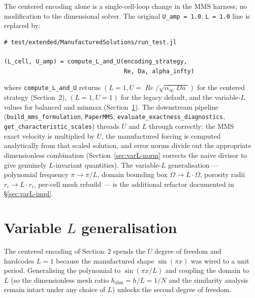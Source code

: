 \documentclass[11pt]{article}
\newcommand{\Reyn}{\operatorname{\mathit{Re}}}
\newcommand{\Damk}{\operatorname{\mathit{Da}}}
\newcommand{\code}[1]{\texttt{#1}}
\begin{document}
The centered encoding alone is a single-cell-loop change in the MMS
harness; no modification to the dimensional solver. The original
\code{U\_amp = 1.0}, \code{L = 1.0} line is replaced by:
\begin{center}
\begin{minipage}{0.9\linewidth}
\begin{lstlisting}[basicstyle=\ttfamily\small, frame=single]
# test/extended/ManufacturedSolutions/run_test.jl

(L_cell, U_amp) = compute_L_and_U(encoding_strategy,
                                  Re, Da, alpha_infty)
\end{lstlisting}
\end{minipage}
\end{center}
\noindent where \code{compute\_L\_and\_U} returns $(L=1, U=\Reyn/\sqrt{\alpha_\infty\Damk})$
for the centered strategy (Section~2), $(L=1, U=1)$ for the legacy
default, and the variable-$L$ values for balanced and minmax
(Section~\ref{sec:varL}). The downstream pipeline
(\code{build\_mms\_formulation}, \code{PaperMMS},
\code{evaluate\_exactness\_diagnostics}, \code{get\_characteristic\_scales})
threads $U$ and $L$ through correctly: the MMS exact velocity is multiplied
by $U$, the manufactured forcing is computed analytically from that
scaled solution, and error norms divide out the appropriate
dimensionless combination (Section~\ref{sec:varL-norm} corrects the
naive divisor to give genuinely $L$-invariant quantities). The
variable-$L$ generalisation — polynomial frequency $\pi \to \pi/L$,
domain bounding box $\Omega \to L \cdot \Omega$, porosity radii
$r_i \to L \cdot r_i$, per-cell mesh rebuild — is the additional refactor
documented in §\ref{sec:varL-impl}.

\section{Variable $L$ generalisation}
\label{sec:varL}

The centered encoding of Section~2 spends the $U$ degree of freedom and
hardcodes $L = 1$ because the manufactured shape
$\sin(\pi x)$ was wired to a unit period. Generalising the polynomial
to $\sin(\pi x / L)$ and coupling the domain to $L$ (so the dimensionless
mesh ratio $h_{\mathrm{dim}} = h / L = 1/N$ and the similarity analysis
remain intact under any choice of $L$) unlocks the second degree of
freedom.
\end{document}
